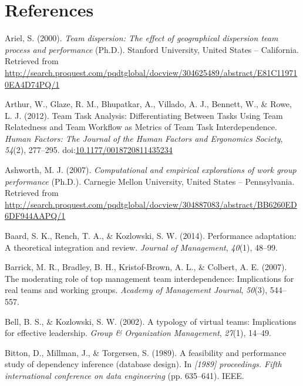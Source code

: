 \documentclass[english,,man]{apa6}
\theoremstyle{definition}
\theoremstyle{definition}
\theoremstyle{definition}
\theoremstyle{remark}
\begin{document}
\newpage

\hypertarget{references}{%
\section{References}\label{references}}

\setlength{\parindent}{-0.5in}
\setlength{\leftskip}{0.5in}

\hypertarget{refs}{}
\leavevmode\hypertarget{ref-ariel_team_2000}{}%
Ariel, S. (2000). \emph{Team dispersion: The effect of geographical
dispersion team process and performance} (Ph.D.). Stanford University,
United States -- California. Retrieved from
\url{http://search.proquest.com/pqdtglobal/docview/304625489/abstract/E81C119710EA4D74PQ/1}

\leavevmode\hypertarget{ref-arthur_team_2012}{}%
Arthur, W., Glaze, R. M., Bhupatkar, A., Villado, A. J., Bennett, W., \&
Rowe, L. J. (2012). Team Task Analysis: Differentiating Between Tasks
Using Team Relatedness and Team Workflow as Metrics of Team Task
Interdependence. \emph{Human Factors: The Journal of the Human Factors
and Ergonomics Society}, \emph{54}(2), 277--295.
doi:\href{https://doi.org/10.1177/0018720811435234}{10.1177/0018720811435234}

\leavevmode\hypertarget{ref-ashworth_computational_2007}{}%
Ashworth, M. J. (2007). \emph{Computational and empirical explorations
of work group performance} (Ph.D.). Carnegie Mellon University, United
States -- Pennsylvania. Retrieved from
\url{http://search.proquest.com/pqdtglobal/docview/304887083/abstract/BB6260ED6DF944AAPQ/1}

\leavevmode\hypertarget{ref-baard_performance_2014}{}%
Baard, S. K., Rench, T. A., \& Kozlowski, S. W. (2014). Performance
adaptation: A theoretical integration and review. \emph{Journal of
Management}, \emph{40}(1), 48--99.

\leavevmode\hypertarget{ref-barrick_moderating_2007}{}%
Barrick, M. R., Bradley, B. H., Kristof-Brown, A. L., \& Colbert, A. E.
(2007). The moderating role of top management team interdependence:
Implications for real teams and working groups. \emph{Academy of
Management Journal}, \emph{50}(3), 544--557.

\leavevmode\hypertarget{ref-bell_typology_2002}{}%
Bell, B. S., \& Kozlowski, S. W. (2002). A typology of virtual teams:
Implications for effective leadership. \emph{Group \& Organization
Management}, \emph{27}(1), 14--49.

\leavevmode\hypertarget{ref-bitton1989feasibility}{}%
Bitton, D., Millman, J., \& Torgersen, S. (1989). A feasibility and
performance study of dependency inference (database design). In
\emph{{[}1989{]} proceedings. Fifth international conference on data
engineering} (pp. 635--641). IEEE.
\end{document}
